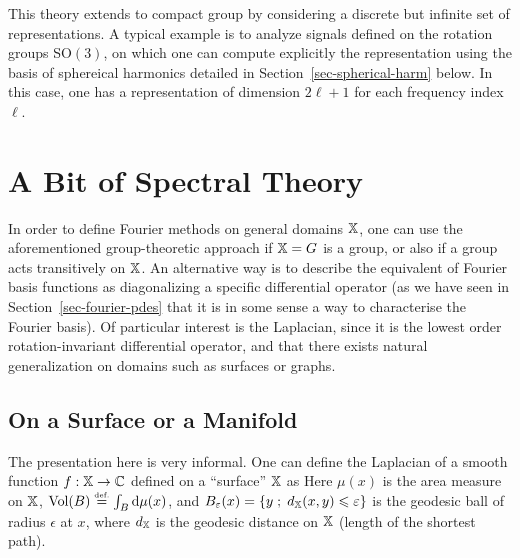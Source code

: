 This theory extends to compact group by considering a discrete but infinite set of representations. A typical example is to analyze signals defined on the rotation groups SO$(3)$, on which one can compute explicitly the representation using the basis of sphereical harmonics detailed in Section~\ref{sec-spherical-harm} below. In this case, one has a representation of dimension $2\ell+1$ for each frequency index $\ell$. 
 
%

\section{A Bit of Spectral Theory}

In order to define Fourier methods on general domains $\mathbb{X}$, one can use the aforementioned group-theoretic approach if $\mathbb{X}=G$ is a group, or also if a group acts transitively on $\mathbb{X}$. An alternative way is to describe the equivalent of Fourier basis functions as diagonalizing a specific differential operator (as we have seen in Section~\ref{sec-fourier-pdes} that it is in some sense a way to characterise the Fourier basis). Of particular interest is the Laplacian, since it is the lowest order rotation-invariant differential operator, and that there exists natural generalization on domains such as surfaces or graphs.


\subsection{On a Surface or a Manifold}

The presentation here is very informal. One can define the Laplacian of a smooth function $f: \mathbb{X} \rightarrow \mathbb{C}$ defined on a ``surface'' $\mathbb{X}$ as
Here $\mu(x)$ is the area measure on $\mathbb{X}$, $\text{Vol}(B) \stackrel{\mbox{\upshape\tiny def.}}{=} \int_B \mathrm{d}\mu(x)$, and $B_\varepsilon(x) = \left\{ y \;;\; d_{\mathbb{X}}(x,y) \leqslant \varepsilon \right\}$ is the geodesic ball of radius $\epsilon$ at $x$, where $d_{\mathbb{X}}$ is the geodesic distance on $\mathbb{X}$ (length of the shortest path). 

